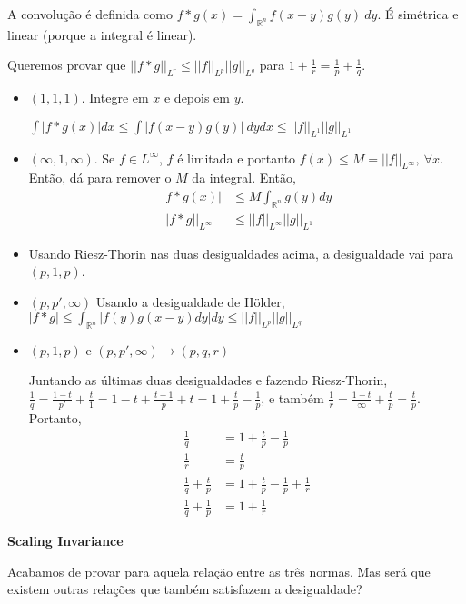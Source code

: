 \documentclass[11pt]{article}
\newcommand{\Rn}{{\mathbb{R}^n}}
\newcommand{\norm}[2]{\left|\left|#1\right|\right|_{L^{#2}}}
\begin{document}
A convolução é definida como \( f * g (x) = \int_\Rn f(x-y)g(y)\ dy \). É simétrica e linear (porque a integral é linear).

Queremos provar que \(\norm{f * g}{r} \leq \norm{f}{p} \norm{g}{q}\) para \( 1 + \frac{1}{r} = \frac{1}{p} + \frac{1}{q} \).

\begin{itemize}
	\item \((1,1,1)\). Integre em \( x \) e depois em \( y \).
	
	\( \int | f * g(x) | dx \leq \int |f(x-y)g(y)|\ dy dx \leq \norm{f}{1} \norm{g}{1}\) 
	
	\item \((\infty, 1, \infty)\). Se \( f \in L^\infty\), \( f \) é limitada e portanto \( f(x)\leq M = \norm{f}{\infty}, \ \forall x \). Então, dá para remover o \( M \) da integral. Então,\begin{align*} |f * g (x) | &\leq M \int_\Rn g(y) dy \\
		\norm{f * g}{\infty} &\leq \norm{f}{\infty} \norm{g}{1}
	\end{align*}

	\item Usando Riesz-Thorin nas duas desigualdades acima, a desigualdade vai para \( (p, 1, p) \).
	
	\item \((p, p', \infty)\) Usando a desigualdade de Hölder, \(| f * g | \leq \int_\Rn |f(y) g(x-y) dy|dy \leq \norm{f}{p} \norm{g}{q}\)
	
	\item \( (p, 1, p) \text{ e } (p, p', \infty) \rightarrow (p, q, r) \)
	
	Juntando as últimas duas desigualdades e fazendo Riesz-Thorin, \( \frac{1}{q} = \frac{1-t}{p'} + \frac{t}{1} = 1-t + \frac{t-1}{p} + t = 1 + \frac{t}{p} - \frac{1}{p}\), e também \( \frac{1}{r} = \frac{1-t}{\infty} + \frac{t}{p} = \frac{t}{p} \). Portanto,
	\begin{align*}
		\frac{1}{q} &= 1 + \frac{t}{p} - \frac{1}{p} \\
		\frac{1}{r} &= \frac{t}{p} \\
		\frac{1}{q} + \frac{t}{p} &= 1 + \frac{t}{p} - \frac{1}{p} + \frac{1}{r} \\
		\frac{1}{q} + \frac{1}{p} &= 1 + \frac{1}{r}
	\end{align*}	
\end{itemize}

\textbf{Scaling Invariance}

Acabamos de provar para aquela relação entre as três normas. Mas será que existem outras relações que também satisfazem a desigualdade? 
\end{document}
